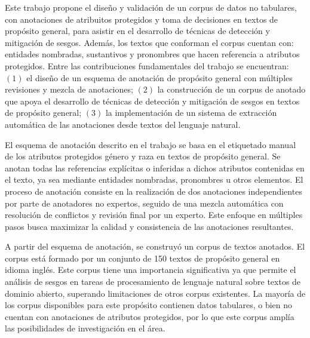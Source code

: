 \begin{conclusions}
    Este trabajo propone el dise\~no y validaci\'on de un corpus de datos no tabulares, con anotaciones de atribuitos
    protegidos y toma de decisiones en textos de prop\'osito general, para asistir en el desarrollo de t\'ecnicas de 
    detecci\'on y mitigaci\'on de sesgos. Adem\'as, los textos que conforman el corpus cuentan con: 
    entidades nombradas, sustantivos y pronombres que hacen referencia a atributos protegidos.
    Entre las contribuciones fundamentales del trabajo se encuentran: $(1)$ el 
    dise\~no de un esquema de anotaci\'on de prop\'osito general con m\'ultiples revisiones y mezcla de anotaciones;
    $(2)$ la construcci\'on de un corpus de anotado que apoya el desarrollo de t\'ecnicas de detecci\'on y mitigaci\'on
    de sesgos en textos de prop\'osito general; $(3)$ la implementaci\'on de un sistema de extracci\'on autom\'atica 
    de las anotaciones desde textos del lenguaje natural.

    El esquema de anotaci\'on descrito en el trabajo se basa en el etiquetado manual de los atributos protegidos g\'enero 
    y raza en textos de prop\'osito general. Se anotan todas las referencias expl\'icitas o inferidas a dichos 
    atributos contenidas en el texto, ya sea mediante entidades nombradas, pronombres u otros elementos. El proceso
    de anotaci\'on consiste en la realizaci\'on de dos anotaciones independientes por parte de anotadores no expertos,
    seguido de una mezcla autom\'atica con resoluci\'on de conflictos y revisi\'on final por un experto. Este enfoque en m\'ultiples 
    pasos busca maximizar la calidad y consistencia de las anotaciones resultantes.

    A partir del esquema de anotaci\'on, se construy\'o un corpus de textos anotados. El corpus est\'a formado por un 
    conjunto de 150 textos de prop\'osito general en idioma ingl\'es. Este corpus tiene una importancia significativa
    ya que permite el an\'alisis de sesgos en tareas de procesamiento de lenguaje natural sobre textos de dominio abierto, 
    superando limitaciones de otros corpus existentes. La mayor\'ia de los corpus disponibles para este prop\'osito
    contienen datos tabulares, o bien no cuentan con anotaciones de atributos protegidos, por lo que este corpus 
    ampl\'ia las posibilidades de investigaci\'on en el \'area.
    

\end{conclusions}
